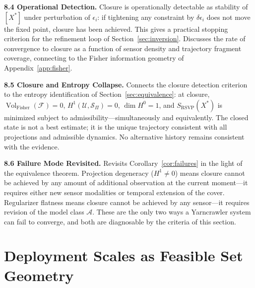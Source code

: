 \documentclass[12pt, oneside]{article}
\DeclareMathOperator{\vol}{Vol}
\begin{document}
{\medskip
\textbf{8.4 Operational Detection.}
Closure is operationally detectable as stability of $[X^*]$ under perturbation of
$\epsilon_i$: if tightening any constraint by $\delta\epsilon_i$ does not move the fixed
point, closure has been achieved. This gives a practical stopping criterion for the
refinement loop of Section~\ref{sec:inversion}. Discusses the rate of convergence to
closure as a function of sensor density and trajectory fragment coverage, connecting to
the Fisher information geometry of Appendix~\ref{app:fisher}.

\medskip
\textbf{8.5 Closure and Entropy Collapse.}
Connects the closure detection criterion to the entropy identification of
Section~\ref{sec:equivalence}: at closure, $\vol_{\mathrm{Fisher}}(\mathcal{F}) = 0$,
$H^1(\mathcal{U},\mathcal{S}_\Pi) = 0$, $\dim H^0 = 1$, and $S_{\mathrm{RSVP}}(X^*)$
is minimized subject to admissibility---simultaneously and equivalently. The closed state
is not a best estimate; it is the unique trajectory consistent with all projections and
admissible dynamics. No alternative history remains consistent with the evidence.

\medskip
\textbf{8.6 Failure Mode Revisited.}
Revisits Corollary~\ref{cor:failures} in the light of the equivalence theorem. Projection
degeneracy ($H^1 \ne 0$) means closure cannot be achieved by any amount of additional
observation at the current moment---it requires either new sensor modalities or temporal
extension of the cover. Regularizer flatness means closure cannot be achieved by any
sensor---it requires revision of the model class $\mathcal{A}$. These are the only two
ways a Yarncrawler system can fail to converge, and both are diagnosable by the criteria
of this section.
}

\section{Deployment Scales as Feasible Set Geometry}
\label{sec:deployment}
\end{document}
